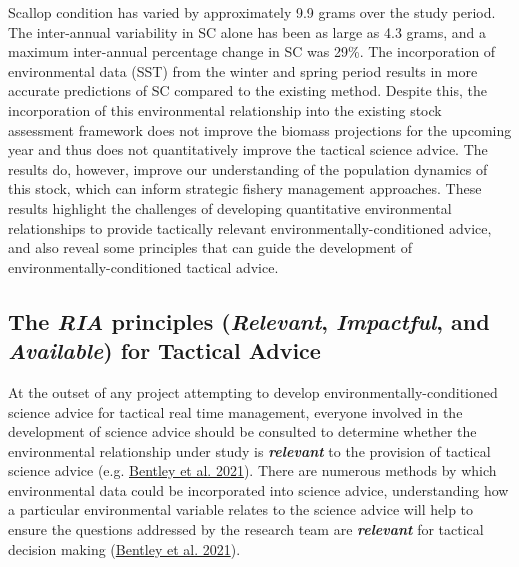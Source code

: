 \documentclass[
]{article}
\begin{document}
Scallop condition has varied by approximately 9.9 grams over the study period. The inter-annual variability in SC alone has been as large as 4.3 grams, and a maximum inter-annual percentage change in SC was 29\%. The incorporation of environmental data (SST) from the winter and spring period results in more accurate predictions of SC compared to the existing method. Despite this, the incorporation of this environmental relationship into the existing stock assessment framework does not improve the biomass projections for the upcoming year and thus does not quantitatively improve the tactical science advice. The results do, however, improve our understanding of the population dynamics of this stock, which can inform strategic fishery management approaches. These results highlight the challenges of developing quantitative environmental relationships to provide tactically relevant environmentally-conditioned advice, and also reveal some principles that can guide the development of environmentally-conditioned tactical advice.

\hypertarget{the-ria-principles-relevant-impactful-and-available-for-tactical-advice}{%
\subsection{\texorpdfstring{The \emph{RIA} principles (\emph{Relevant}, \emph{Impactful}, and \emph{Available}) for Tactical Advice}{The RIA principles (Relevant, Impactful, and Available) for Tactical Advice}}\label{the-ria-principles-relevant-impactful-and-available-for-tactical-advice}}

At the outset of any project attempting to develop environmentally-conditioned science advice for tactical real time management, everyone involved in the development of science advice should be consulted to determine whether the environmental relationship under study is \textbf{\emph{relevant}} to the provision of tactical science advice (e.g. \protect\hyperlink{ref-bentleyRefiningFisheriesAdvice2021}{Bentley et al. 2021}). There are numerous methods by which environmental data could be incorporated into science advice, understanding how a particular environmental variable relates to the science advice will help to ensure the questions addressed by the research team are \textbf{\emph{relevant}} for tactical decision making (\protect\hyperlink{ref-bentleyRefiningFisheriesAdvice2021}{Bentley et al. 2021}).
\end{document}
